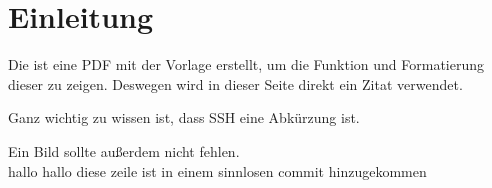 \section{Einleitung}
Die ist eine PDF mit der Vorlage erstellt, um die Funktion und Formatierung dieser zu zeigen.
Deswegen wird in dieser Seite direkt ein Zitat verwendet.

Ganz wichtig zu wissen ist, dass \ac*{SSH} eine Abkürzung ist.

Ein Bild sollte außerdem nicht fehlen.\\
hallo hallo diese zeile ist in einem sinnlosen commit hinzugekommen
\newpage
